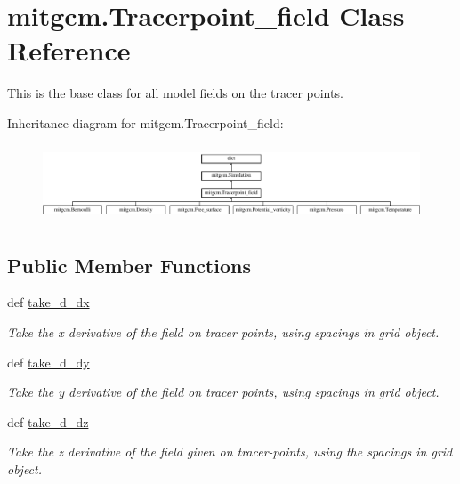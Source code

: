 \hypertarget{classmitgcm_1_1Tracerpoint__field}{}\section{mitgcm.\+Tracerpoint\+\_\+field Class Reference}
\label{classmitgcm_1_1Tracerpoint__field}


This is the base class for all model fields on the tracer points.  


Inheritance diagram for mitgcm.\+Tracerpoint\+\_\+field\+:\begin{figure}[H]
\begin{center}
\leavevmode
\includegraphics[height=2.304527cm]{classmitgcm_1_1Tracerpoint__field}
\end{center}
\end{figure}
\subsection*{Public Member Functions}
\begin{DoxyCompactItemize}
\item 
def \hyperlink{classmitgcm_1_1Tracerpoint__field_aaf8a54b25699658f016209c2624ccaac}{take\+\_\+d\+\_\+dx}
\begin{DoxyCompactList}\small\item\em Take the x derivative of the field on tracer points, using spacings in grid object. \end{DoxyCompactList}\item 
def \hyperlink{classmitgcm_1_1Tracerpoint__field_abe875d49041c764c65b579c6a0ba6c13}{take\+\_\+d\+\_\+dy}
\begin{DoxyCompactList}\small\item\em Take the y derivative of the field on tracer points, using spacings in grid object. \end{DoxyCompactList}\item 
def \hyperlink{classmitgcm_1_1Tracerpoint__field_aae9d224b41b5cf62433fd5fe473a8116}{take\+\_\+d\+\_\+dz}
\begin{DoxyCompactList}\small\item\em Take the z derivative of the field given on tracer-\/points, using the spacings in grid object. \end{DoxyCompactList}\end{DoxyCompactItemize}
